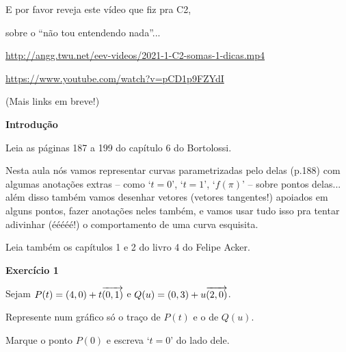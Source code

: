\documentclass[oneside,12pt]{article}
\begin{document}
E por favor reveja este vídeo que fiz pra C2,

sobre o ``não tou entendendo nada''...

\ssk

{\footnotesize

\url{http://angg.twu.net/eev-videos/2021-1-C2-somas-1-dicas.mp4}

\url{https://www.youtube.com/watch?v=pCD1p9FZYdI}

}

\msk

(Mais links em breve!)




\newpage


{\bf Introdução}

Leia as páginas 187 a 199 do capítulo 6 do Bortolossi.

Nesta aula nós vamos representar curvas parametrizadas pelo
 delas (p.188) com algumas anotações extras -- como
`$t=0$', `$t=1$', `$f(π)$' -- sobre pontos delas... além disso também
vamos desenhar vetores (vetores tangentes!) apoiados em alguns pontos,
fazer anotações neles também, e vamos usar tudo isso pra tentar
adivinhar (ééééé!) o comportamento de uma curva esquisita.


\bsk


Leia também os capítulos 1 e 2 do livro 4 do Felipe Acker.


\newpage

%

{\bf Exercício 1}

Sejam $P(t) = (4,0) + t{\overrightarrow{(0,1)}}$ e $Q(u) = (0,3) + u{\overrightarrow{(2,0)}}$.

Represente num gráfico só o traço de $P(t)$ e o de $Q(u)$.

Marque o ponto $P(0)$ e escreva `$t=0$' do lado dele.
\end{document}
